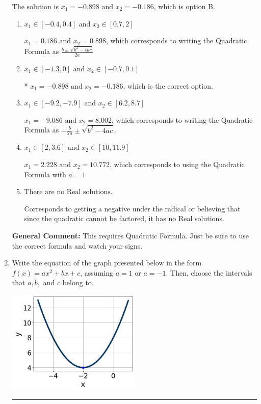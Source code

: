 \documentclass{extbook}[14pt]
\newcommand{\litem}[1]{\item #1

\rule{\textwidth}{0.4pt}}
\begin{document}
\begin{enumerate}
{The solution is \( x_1 = -0.898 \text{ and } x_2 = -0.186 \), which is option B.\begin{enumerate}[label=\Alph*.]
\item \( x_1 \in [-0.4, 0.4] \text{ and } x_2 \in [0.7, 2] \)

 $x_1 = 0.186 \text{ and } x_2 = 0.898$, which corresponds to writing the Quadratic Formula as $\frac{b \pm \sqrt{b^2 - 4ac}}{2a}$
\item \( x_1 \in [-1.3, 0] \text{ and } x_2 \in [-0.7, 0.1] \)

* $x_1 = -0.898 \text{ and } x_2 = -0.186$, which is the correct option.
\item \( x_1 \in [-9.2, -7.9] \text{ and } x_2 \in [6.2, 8.7] \)

 $x_1 = -9.086 \text{ and } x_2 = 8.002$, which corresponds to writing the Quadratic Formula as $-\frac{b}{2a} \pm \sqrt{b^2 - 4ac}$.
\item \( x_1 \in [2, 3.6] \text{ and } x_2 \in [10, 11.9] \)

 $x_1 = 2.228 \text{ and } x_2 = 10.772$, which corresponds to using the Quadratic Formula with $a=1$
\item \( \text{There are no Real solutions.} \)

Corresponds to getting a negative under the radical or believing that since the quadratic cannot be factored, it has no Real solutions.
\end{enumerate}

\textbf{General Comment:} This requires Quadratic Formula. Just be sure to use the correct formula and watch your signs.
}
\litem{
Write the equation of the graph presented below in the form $f(x)=ax^2+bx+c$, assuming  $a=1$ or $a=-1$. Then, choose the intervals that $a, b,$ and $c$ belong to.

\begin{center}
    \includegraphics[width=0.5\textwidth]{../Figures/quadraticGraphToEquationA.png}
\end{center}




}
\end{enumerate}
\end{document}
